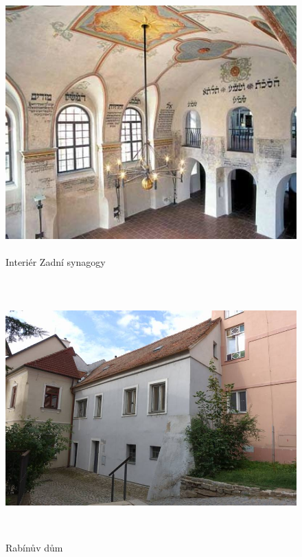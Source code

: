 \documentclass[a4paper,oneside,12pt]{report}
\begin{document}
\begin{figure}[h]
	\centering
	\includegraphics[height=10cm]{../img/zadniSynagogaInterier}
	\caption[Zadní synagoga \text{[online]} Czech tourism. Dostupné z: \url{https://www.czechtourism.com/c/trebic-rear-synagogue/} \text{[cit. 2020-03-27]}]{
		Interiér Zadní synagogy
	}
	\label{fig:zsi}
\end{figure}

\begin{figure}[h]
	\centering
	\includegraphics[height=10cm]{../img/rabinuvDumBudova.jpg}
	\caption[Rabínův dům \text{[online]} NPÚ památkový katalog. Dostupné z: \url{https://www.pamatkovykatalog.cz/rabinsky-dum-22238373} \text{[cit. 2020-03-28]}]{
		Rabínův dům
	}
	\label{fig:rdb}
\end{figure}
\end{document}
